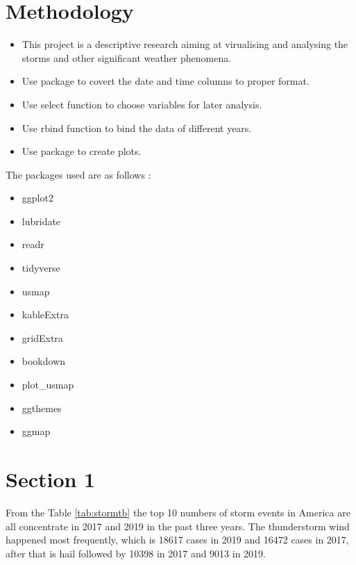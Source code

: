 \documentclass[
]{article}
\begin{document}
\hypertarget{methodology}{%
\section{Methodology}\label{methodology}}

\begin{itemize}
\item
  This project is a descriptive research aiming at virualising and analysing the storms and other significant weather phenomena.
\item
  Use \citet{lubridate} package to covert the date and time columns to proper format.
\item
  Use select function to choose variables for later analysis.
\item
  Use rbind function to bind the data of different years.
\item
  Use \citet{ggplot2} package to create plots.
\end{itemize}

The packages used are as follows :

\begin{itemize}
\item
  ggplot2 \citep{ggplot2}
\item
  lubridate \citep{lubridate}
\item
  readr \citep{readr}
\item
  tidyverse \citep{tidyverse}
\item
  usmap \citep{usmap}
\item
  kableExtra \citep{kableExtra}
\item
  gridExtra \citep{gridExtra}
\item
  bookdown \citep{bookdown}
\item
  plot\_usmap \citep{usmap}
\item
  ggthemes\citep{ggthemes}
\item
  ggmap \citep{ggmap}
\end{itemize}

\clearpage

\hypertarget{section-1}{%
\section{Section 1}\label{section-1}}

From the Table \ref{tab:stormtb} the top 10 numbers of storm events in America are all concentrate in 2017 and 2019 in the past three years. The thunderstorm wind happened most frequently, which is 18617 cases in 2019 and 16472 cases in 2017, after that is hail followed by 10398 in 2017 and 9013 in 2019.
\end{document}
